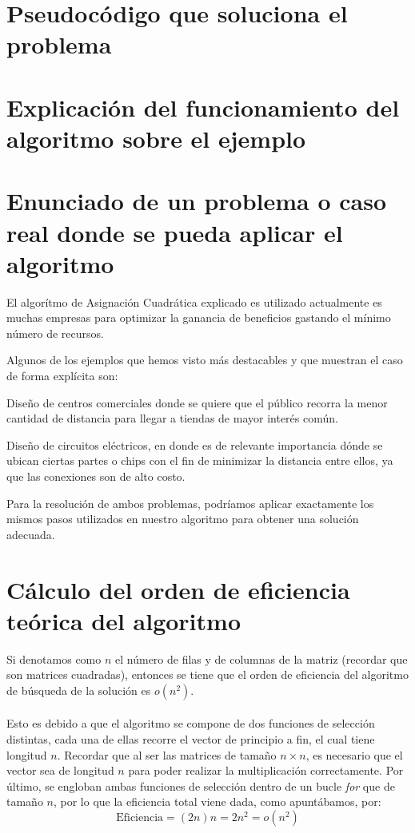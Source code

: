 \documentclass[11pt, a4paper]{article}
\theoremstyle{theorem-style}
\theoremstyle{definition-style}
\theoremstyle{remark-style}
\theoremstyle{example-style}
\begin{document}
\section{Pseudocódigo que soluciona el problema}

\section{Explicación del funcionamiento del algoritmo sobre el ejemplo}

\section{Enunciado de un problema o caso real donde se pueda aplicar el algoritmo}

El algorítmo de Asignación Cuadrática explicado es utilizado actualmente es muchas empresas para optimizar la ganancia de beneficios gastando el mínimo número de recursos.

Algunos de los ejemplos que hemos visto más destacables y que muestran el caso de forma explícita son:

Diseño de centros comerciales donde se quiere que el público recorra
la menor cantidad de distancia para llegar a tiendas de mayor interés común. 

Diseño de circuitos eléctricos, en donde es de relevante importancia
dónde se ubican ciertas partes o chips con el fin de minimizar la
distancia entre ellos, ya que las conexiones son de alto costo.

Para la resolución de ambos problemas, podríamos aplicar exactamente los mismos pasos utilizados en nuestro algoritmo para obtener una solución adecuada.

\section{Cálculo del orden de eficiencia teórica del algoritmo }
Si denotamos como $n$ el número de filas y de columnas de la matriz (recordar que son matrices cuadradas), entonces se tiene que el orden de eficiencia del algoritmo de búsqueda de la solución es $o(n^2)$.
\paragraph{}
Esto es debido a que el algoritmo se compone de dos funciones de selección distintas, cada una de ellas recorre el vector de principio a fin, el cual tiene longitud $n$.  Recordar que al ser las matrices de tamaño $n\times n$, es necesario que el vector sea de longitud $n$ para poder realizar la multiplicación correctamente. Por último, se engloban ambas funciones de selección dentro de un bucle \textit{for} que de tamaño $n$, por lo que la eficiencia total viene dada, como apuntábamos, por:
$$\textrm{Eficiencia}= (2n)n=2n^2=o(n^2)$$
\end{document}

